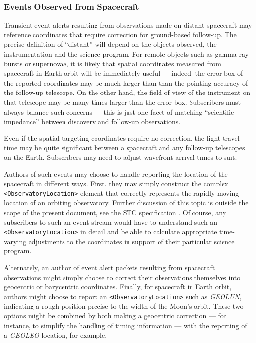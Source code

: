 \documentclass[11pt,a4paper]{ivoa}
\begin{document}
\subsubsection{Events Observed from Spacecraft}
\label{sec:3.4.5}
Transient event alerts resulting from observations made on distant spacecraft may reference coordinates that require correction for ground-based follow-up. The precise definition of ``distant'' will depend on the objects observed, the instrumentation and the science program. For remote objects such as gamma-ray bursts or supernovae, it is likely that spatial coordinates measured from spacecraft in Earth orbit will be immediately useful --- indeed, the error box of the reported coordinates may be much larger than than the pointing accuracy of the follow-up telescope. On the other hand, the field of view of the instrument on that telescope may be many times larger than the error box. Subscribers must always balance such concerns --- this is just one facet of matching ``scientific impedance'' between discovery and follow-up observations. 

Even if the spatial targeting coordinates require no correction, the light travel time may be quite significant between a spacecraft and any follow-up telescopes on the Earth. Subscribers may need to adjust wavefront arrival times to suit. 

Authors of such events may choose to handle reporting the location of the spacecraft in different ways. First, they may simply construct the complex {\tt <ObservatoryLocation>} element that correctly represents the rapidly moving location of an orbiting observatory. Further discussion of this topic is outside the scope of the present document, see the STC specification \citep{2007ivoa.spec.1030R}. Of course, any subscribers to such an event stream would have to understand such an {\tt <ObservatoryLocation>} in detail and be able to calculate appropriate time-varying adjustments to the coordinates in support of their particular science program. 

Alternately, an author of event alert packets resulting from spacecraft observations might simply choose to correct their observations themselves into geocentric or barycentric coordinates. Finally, for spacecraft in Earth orbit, authors might choose to report an {\tt <ObservatoryLocation>} such as \emph{GEOLUN}, indicating a rough position precise to the width of the Moon's orbit. These two options might be combined by both making a geocentric correction --- for instance, to simplify the handling of timing information --- with the reporting of a \emph{GEOLEO} location, for example. 
\end{document}
